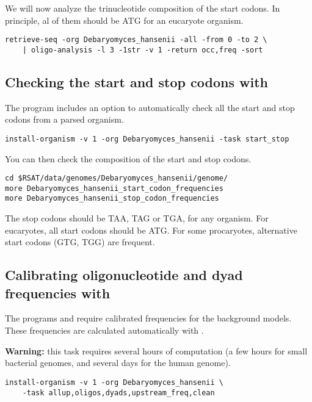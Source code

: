We will now analyze the trinucleotide composition of the start
codons. In principle, al of them should be ATG for an eucaryote
organism.

\begin{verbatim}
retrieve-seq -org Debaryomyces_hansenii -all -from 0 -to 2 \
    | oligo-analysis -l 3 -1str -v 1 -return occ,freq -sort
\end{verbatim}

\subsection{Checking the start and stop codons with }

The program  includes an option to
automatically check all the start and stop codons from a parsed
organism.

\begin{verbatim}
install-organism -v 1 -org Debaryomyces_hansenii -task start_stop
\end{verbatim}

You can then check the composition of the start and stop codons.

\begin{verbatim}
cd $RSAT/data/genomes/Debaryomyces_hansenii/genome/
more Debaryomyces_hansenii_start_codon_frequencies
more Debaryomyces_hansenii_stop_codon_frequencies
\end{verbatim}

The stop codons should be TAA, TAG or TGA, for any organism. For
eucaryotes, all start codons should be ATG. For some procaryotes,
alternative start codons (GTG, TGG) are frequent.

\subsection{Calibrating oligonucleotide and dyad frequencies with }

The programs  and 
  require calibrated frequencies for the background models. These
  frequencies are calculated automatically with
  .

\textbf{Warning: } this task requires several hours of computation (a
few hours for small bacterial genomes, and several days for the human
genome).

\begin{verbatim}
install-organism -v 1 -org Debaryomyces_hansenii \
    -task allup,oligos,dyads,upstream_freq,clean
\end{verbatim}

